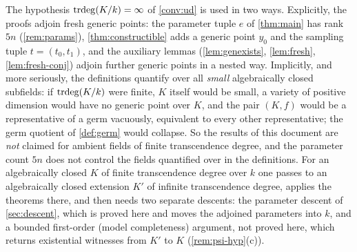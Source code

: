 \begin{remark}\label{rem:finite-trdeg}
The hypothesis $\operatorname{trdeg}(K/k)=\infty$ of \cref{conv:ud} is used in two ways.  Explicitly,
the proofs adjoin fresh generic points: the parameter tuple $e$ of \cref{thm:main} has
rank $5n$ (\cref{rem:params}), \cref{thm:constructible} adds a generic point $y_0$ and the
sampling tuple $t=(t_0,t_1)$, and the auxiliary lemmas (\cref{lem:genexists},
\cref{lem:fresh}, \cref{lem:fresh-conj}) adjoin further generic points in a nested way.
Implicitly, and more seriously, the definitions quantify over all \emph{small}
algebraically closed subfields: if $\operatorname{trdeg}(K/k)$ were finite, $K$ itself would be small,
a variety of positive dimension would have no generic point over $K$, and the pair
$(K,f)$ would be a representative of a germ vacuously, equivalent to every other
representative; the germ quotient of \cref{def:germ} would collapse.  So the results of
this document are \emph{not} claimed for ambient fields of finite transcendence degree,
and the parameter count $5n$ does not control the fields quantified over in the
definitions.  For an algebraically closed $K$ of finite transcendence degree over $k$
one passes to an algebraically closed extension $K'$ of infinite transcendence degree,
applies the theorems there, and then needs two separate descents: the parameter
descent of \cref{sec:descent}, which is proved here and moves the adjoined parameters
into $k$, and a bounded first-order (model completeness) argument, not proved here,
which returns existential witnesses from $K'$ to $K$ (\cref{rem:psi-hyp}(c)).
\end{remark}
